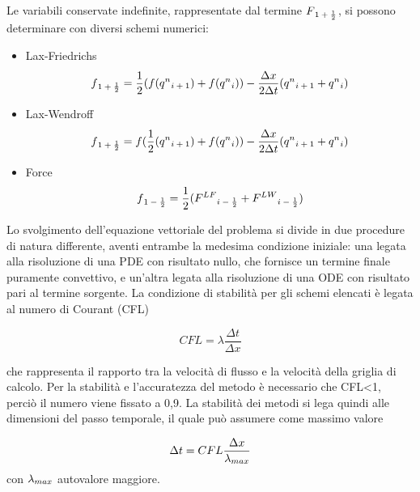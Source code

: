 \documentclass[12pt]{article} %
\begin{document}
\noindent Le variabili conservate indefinite, rappresentate dal termine $F\textsubscript{$1+\frac{1}{2}$}$, si possono determinare con diversi schemi numerici:
\begin{itemize}
    \item Lax-Friedrichs 
    \begin{equation}
        f\textsubscript{$1+\frac{1}{2}$}=\frac{1}{2}(f(q^n\textsubscript{$i+1$})+f(q^n\textsubscript{$i$}))-\frac{\Delta x}{2\Delta t}(q^n\textsubscript{$i+1$}+q^n\textsubscript{$i$})
    \end{equation}
    \item Lax-Wendroff 
     \begin{equation}
        f\textsubscript{$1+\frac{1}{2}$}=f(\frac{1}{2}(q^n\textsubscript{$i+1$})+f(q^n\textsubscript{$i$}))-\frac{\Delta x}{2\Delta t}(q^n\textsubscript{$i+1$}+q^n\textsubscript{$i$})
    \end{equation}
    \item Force
     \begin{equation}
      f\textsubscript{$1-\frac{1}{2}$}=\frac{1}{2}(F^{LF}\textsubscript{$i-\frac{1}{2}$}+F^{LW}\textsubscript{$i-\frac{1}{2}$})
    \end{equation}
\end{itemize}

\noindent Lo svolgimento dell’equazione vettoriale del problema si divide in due procedure di natura differente, aventi entrambe la medesima condizione iniziale: una legata alla risoluzione di una PDE con risultato nullo, che fornisce un termine finale puramente convettivo, e un’altra legata alla risoluzione di una ODE con risultato pari al termine sorgente.
La condizione di stabilità per gli schemi elencati è legata al numero di Courant (CFL)

\begin{equation}
    CFL=\lambda\frac{\Delta t}{\Delta x}
\end{equation}

\noindent che rappresenta il rapporto tra la velocità di flusso e la velocità della griglia di calcolo. Per la stabilità e l’accuratezza del metodo è necessario che CFL<1, perciò il numero viene fissato a 0,9.
La stabilità dei metodi si lega quindi alle dimensioni del passo temporale, il quale può assumere come massimo valore

\begin{equation}
    \Delta t=CFL\frac{\Delta x}{\lambda\textsubscript{$max$}}
\end{equation}
con $\lambda\textsubscript{$max$}$ autovalore maggiore.
\end{document}
